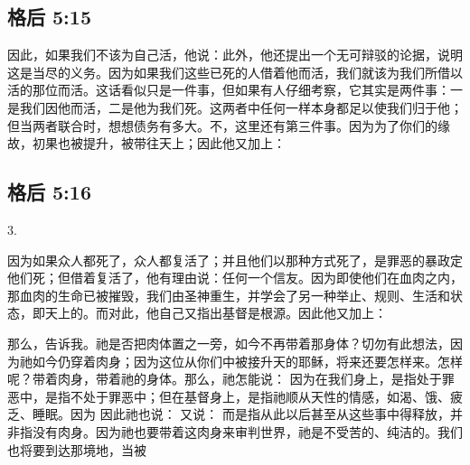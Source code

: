 
\subsection{格后 5:15}

\par

因此，如果我们不该为自己活，他说：此外，他还提出一个无可辩驳的论据，说明这是当尽的义务。因为如果我们这些已死的人借着他而活，我们就该为我们所借以活的那位而活。这话看似只是一件事，但如果有人仔细考察，它其实是两件事：一是我们因他而活，二是他为我们死。这两者中任何一样本身都足以使我们归于他；但当两者联合时，想想债务有多大。不，这里还有第三件事。因为为了你们的缘故，初果也被提升，被带往天上；因此他又加上：\par


\subsection{格后 5:16}

3. \par

因为如果众人都死了，众人都复活了；并且他们以那种方式死了，是罪恶的暴政定他们死；但借着复活了，他有理由说：任何一个信友。因为即使他们在血肉之内，那血肉的生命已被摧毁，我们由圣神重生，并学会了另一种举止、规则、生活和状态，即天上的。而对此，他自己又指出基督是根源。因此他又加上：\par

\par

那么，告诉我。祂是否把肉体置之一旁，如今不再带着那身体？切勿有此想法，因为祂如今仍穿着肉身；因为这位从你们中被接升天的耶稣，将来还要怎样来。怎样呢？带着肉身，带着祂的身体。那么，祂怎能说： 因为在我们身上，是指处于罪恶中，是指不处于罪恶中；但在基督身上，是指祂顺从天性的情感，如渴、饿、疲乏、睡眠。因为 因此祂也说： 又说： 而是指从此以后甚至从这些事中得释放，并非指没有肉身。因为祂也要带着这肉身来审判世界，祂是不受苦的、纯洁的。我们也将要到达那境地，当被\par

